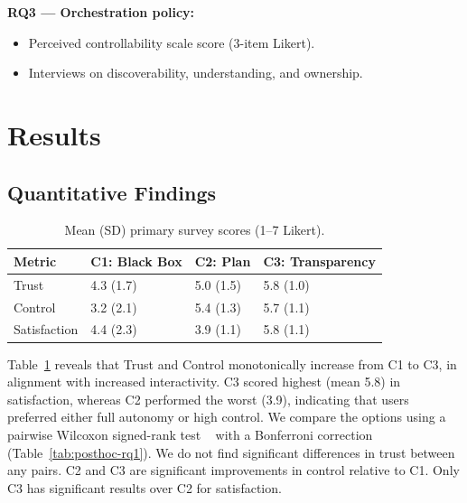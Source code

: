 \documentclass[sigconf, anonymous]{acmart}
\begin{document}
\textbf{RQ3 --- Orchestration policy:}
\begin{itemize}
  \item Perceived controllability scale score (3-item Likert).
  \item Interviews on discoverability, understanding, and ownership.
\end{itemize}

\section{Results}
\subsection{Quantitative Findings}

\begin{table}[h]
  \caption{Mean (SD) primary survey scores (1--7 Likert).}
  \label{tab:results}
  \small
  \begin{tabular}{p{} p{} p{} p{}}
    \toprule
    Metric & C1: Black Box & C2: Plan & C3: Transparency \\
    \midrule
    Trust                & 4.3 (1.7) & 5.0 (1.5) & 5.8 (1.0) \\
    Control              & 3.2 (2.1) & 5.4 (1.3) & 5.7 (1.1) \\
    Satisfaction         & 4.4 (2.3) & 3.9 (1.1) & 5.8 (1.1) \\
    \bottomrule
  \end{tabular}
\end{table}


Table~\ref{tab:results} reveals that Trust and Control monotonically increase from C1 to C3, in alignment with increased interactivity. C3 scored highest (mean 5.8) in satisfaction, whereas C2 performed the worst (3.9), indicating that users preferred either full autonomy or high control. We compare the options using a pairwise Wilcoxon signed-rank test ~\cite{doi:https://doi.org/10.1002/9780471462422.eoct979} with a Bonferroni correction (Table~\ref{tab:posthoc-rq1}). We do not find significant differences in trust between any pairs. C2 and C3 are significant improvements in control relative to C1. Only C3 has significant results over C2 for satisfaction.
\end{document}

